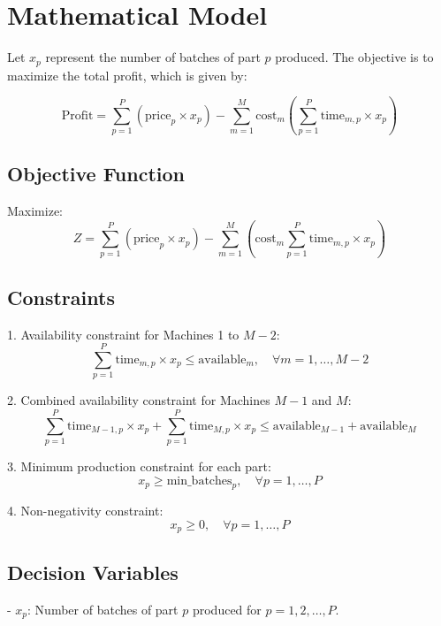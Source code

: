 \documentclass{article}
\begin{document}
\section*{Mathematical Model}

Let \( x_p \) represent the number of batches of part \( p \) produced. The objective is to maximize the total profit, which is given by:

\[
\text{Profit} = \sum_{p=1}^{P} (\text{price}_p \times x_p) - \sum_{m=1}^{M} \text{cost}_m \left( \sum_{p=1}^{P} \text{time}_{m,p} \times x_p \right)
\]

\subsection*{Objective Function}

Maximize:
\[
Z = \sum_{p=1}^{P} \left( \text{price}_p \times x_p \right) - \sum_{m=1}^{M} \left( \text{cost}_m \sum_{p=1}^{P} \text{time}_{m,p} \times x_p \right)
\]

\subsection*{Constraints}

1. Availability constraint for Machines 1 to \( M-2 \):
\[
\sum_{p=1}^{P} \text{time}_{m,p} \times x_p \leq \text{available}_m, \quad \forall m = 1, \ldots, M-2
\]

2. Combined availability constraint for Machines \( M-1 \) and \( M \):
\[
\sum_{p=1}^{P} \text{time}_{M-1,p} \times x_p + \sum_{p=1}^{P} \text{time}_{M,p} \times x_p \leq \text{available}_{M-1} + \text{available}_M
\]

3. Minimum production constraint for each part:
\[
x_p \geq \text{min\_batches}_p, \quad \forall p = 1, \ldots, P
\]

4. Non-negativity constraint:
\[
x_p \geq 0, \quad \forall p = 1, \ldots, P
\]

\subsection*{Decision Variables}
- \( x_p \): Number of batches of part \( p \) produced for \( p = 1, 2, \ldots, P \).
\end{document}
